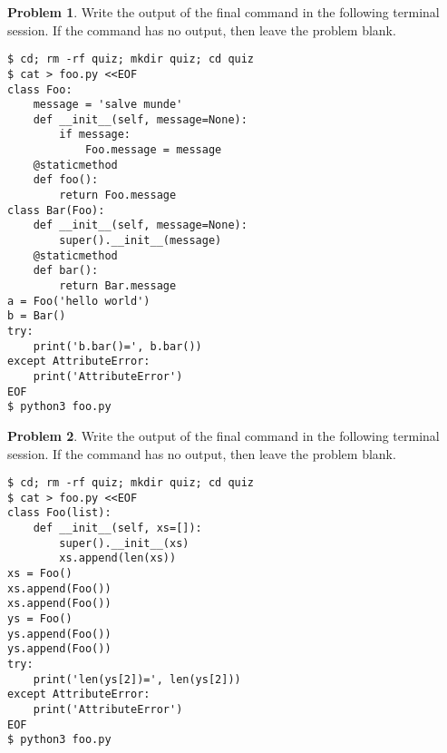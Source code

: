 \documentclass[10pt]{article}
\theoremstyle{definition}
\newtheorem{problem}{Problem}
\begin{document}
\newpage
\begin{problem}
    Write the output of the final command in the following terminal session.
    If the command has no output, then leave the problem blank.
\end{problem}
\begin{lstlisting}
$ cd; rm -rf quiz; mkdir quiz; cd quiz
$ cat > foo.py <<EOF
class Foo:
    message = 'salve munde'
    def __init__(self, message=None):
        if message:
            Foo.message = message
    @staticmethod
    def foo():
        return Foo.message
class Bar(Foo):
    def __init__(self, message=None):
        super().__init__(message)
    @staticmethod
    def bar():
        return Bar.message
a = Foo('hello world')
b = Bar()
try:
    print('b.bar()=', b.bar())
except AttributeError:
    print('AttributeError') 
EOF
$ python3 foo.py
\end{lstlisting}

\newpage
\begin{problem}
    Write the output of the final command in the following terminal session.
    If the command has no output, then leave the problem blank.
\end{problem}
\begin{lstlisting}
$ cd; rm -rf quiz; mkdir quiz; cd quiz
$ cat > foo.py <<EOF
class Foo(list):
    def __init__(self, xs=[]):
        super().__init__(xs)
        xs.append(len(xs))
xs = Foo()
xs.append(Foo())
xs.append(Foo())
ys = Foo()
ys.append(Foo())
ys.append(Foo())
try:
    print('len(ys[2])=', len(ys[2]))
except AttributeError:
    print('AttributeError') 
EOF
$ python3 foo.py
\end{lstlisting}
\end{document}
